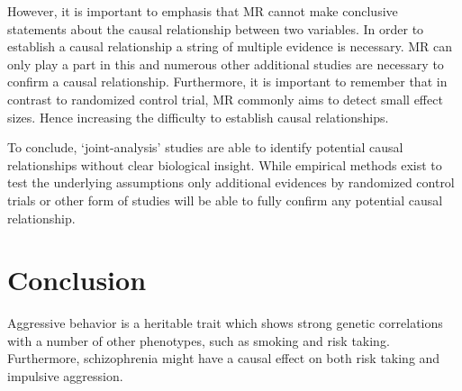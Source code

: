 However, it is important to emphasis that MR cannot make conclusive statements about the causal relationship between two variables.
In order to establish a causal relationship a string of multiple evidence is necessary.
MR can only play a part in this and numerous other additional studies are necessary to confirm a causal relationship.
Furthermore, it is important to remember that in contrast to randomized control trial, MR commonly aims to detect small effect sizes.
Hence increasing the difficulty to establish causal relationships. 

To conclude, `joint-analysis' studies are able to identify potential causal relationships without clear biological insight.
While empirical methods exist to test the underlying assumptions only additional evidences by randomized control trials or other form of studies will be able to fully confirm any potential causal relationship.

\section{Conclusion}
\label{sec:conclusion}

Aggressive behavior is a heritable trait which shows strong genetic correlations with a number of other phenotypes, such as smoking and risk taking.
Furthermore, schizophrenia might have a causal effect on both risk taking and impulsive aggression.
